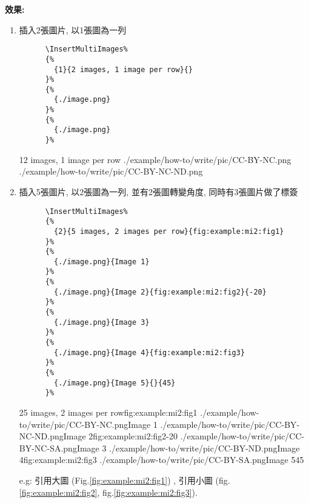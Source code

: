   {\bf 效果:}
  \begin{enumerate}
    \item
    {
      插入2張圖片, 以1張圖為一列
      \begin{verbatim}
      \InsertMultiImages%
      {%
        {1}{2 images, 1 image per row}{}
      }%
      {%
        {./image.png}
      }%
      {%
        {./image.png}
      }%
      \end{verbatim}
      \InsertMultiImages%
      {%
        {1}{2 images, 1 image per row}{}
      }%
      {%
        {./example/how-to/write/pic/CC-BY-NC.png}
      }%
      {%
        {./example/how-to/write/pic/CC-BY-NC-ND.png}
      }%
    } %

    \newpage

    \item
    {
      插入5張圖片, 以2張圖為一列, 並有2張圖轉變角度, 同時有3張圖片做了標簽
      \begin{verbatim}
      \InsertMultiImages%
      {%
        {2}{5 images, 2 images per row}{fig:example:mi2:fig1}
      }%
      {%
        {./image.png}{Image 1}
      }%
      {%
        {./image.png}{Image 2}{fig:example:mi2:fig2}{-20}
      }%
      {%
        {./image.png}{Image 3}
      }%
      {%
        {./image.png}{Image 4}{fig:example:mi2:fig3}
      }%
      {%
        {./image.png}{Image 5}{}{45}
      }%
      \end{verbatim}
      \InsertMultiImages%
      {%
        {2}{5 images, 2 images per row}{fig:example:mi2:fig1}
      }%
      {%
        {./example/how-to/write/pic/CC-BY-NC.png}{Image 1}
      }%
      {%
        {./example/how-to/write/pic/CC-BY-NC-ND.png}{Image 2}{fig:example:mi2:fig2}{-20}
      }%
      {%
        {./example/how-to/write/pic/CC-BY-NC-SA.png}{Image 3}
      }%
      {%
        {./example/how-to/write/pic/CC-BY-ND.png}{Image 4}{fig:example:mi2:fig3}
      }%
      {%
        {./example/how-to/write/pic/CC-BY-SA.png}{Image 5}{}{45}
      }%
    } %

      e.g: 
      引用大圖 (Fig.\ref{fig:example:mi2:fig1}) ,
      引用小圖 (fig.\ref{fig:example:mi2:fig2}, fig.\ref{fig:example:mi2:fig3}).
  \end{enumerate}

\EndChapter

